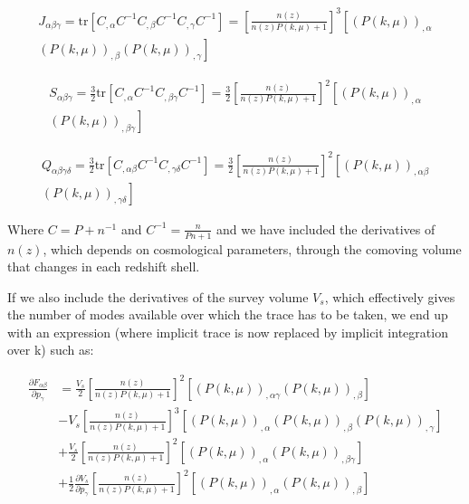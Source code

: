 \begin{multline}
J_{\alpha\beta\gamma}=\mbox{tr}\left[C_{,\alpha}C^{-1}C_{,\beta}C^{-1}C_{,\gamma}C^{-1}\right]=\left[\frac{n(z)}{n(z)P(k,\mu)+1}\right]^{3}\left[\left(P(k,\mu)\right)_{,\alpha}\right.\\
\left.\left(P(k,\mu)\right)_{,\beta}\left(P(k,\mu)\right)_{,\gamma}\right]
\end{multline}


\begin{multline}
S_{\alpha\beta\gamma}=\frac{3}{2}\mbox{tr}\left[C_{,\alpha}C^{-1}C_{,\beta\gamma}C^{-1}\right]=\frac{3}{2}\left[\frac{n(z)}{n(z)P(k,\mu)+1}\right]^{2}\left[\left(P(k,\mu)\right)_{,\alpha}\right.\\
\left.\left(P(k,\mu)\right)_{,\beta\gamma}\right]
\end{multline}


\begin{multline}
Q_{\alpha\beta\gamma\delta}=\frac{3}{2}\mbox{tr}\left[C_{,\alpha\beta}C^{-1}C_{,\gamma\delta}C^{-1}\right]=\frac{3}{2}\left[\frac{n(z)}{n(z)P(k,\mu)+1}\right]^{2}\left[\left(P(k,\mu)\right)_{,\alpha\beta}\right.\\
\left.\left(P(k,\mu)\right)_{,\gamma\delta}\right]
\end{multline}


Where $C=P+n^{-1}$ and $C^{-1}=\frac{n}{Pn+1}$ and we have included
the derivatives of $n(z)$, which depends on cosmological parameters,
through the comoving volume that changes in each redshift shell.

If we also include the derivatives of the survey volume $V_{s}$,
which effectively gives the number of modes available over which the
trace has to be taken, we end up with an expression (where implicit
trace is now replaced by implicit integration over k) such as:

\begin{align}
\frac{\partial F_{\alpha\beta}}{\partial p_{\gamma}} & =\frac{V_{s}}{2}\left[\frac{n(z)}{n(z)P(k,\mu)+1}\right]^{2}\left[\left(P(k,\mu)\right)_{,\alpha\gamma}\left(P(k,\mu)\right)_{,\beta}\right]\label{eq:Tensor-Taylor}\\
& -V_{s}\left[\frac{n(z)}{n(z)P(k,\mu)+1}\right]^{3}\left[\left(P(k,\mu)\right)_{,\alpha}\left(P(k,\mu)\right)_{,\beta}\left(P(k,\mu)\right)_{,\gamma}\right]\nonumber \\
& +\frac{V_{s}}{2}\left[\frac{n(z)}{n(z)P(k,\mu)+1}\right]^{2}\left[\left(P(k,\mu)\right)_{,\alpha}\left(P(k,\mu)\right)_{,\beta\gamma}\right]\nonumber \\
& +\frac{1}{2}\frac{\partial V_{s}}{\partial p_{\gamma}}\left[\frac{n(z)}{n(z)P(k,\mu)+1}\right]^{2}\left[\left(P(k,\mu)\right)_{,\alpha}\left(P(k,\mu)\right)_{,\beta}\right]\nonumber 
\end{align}


